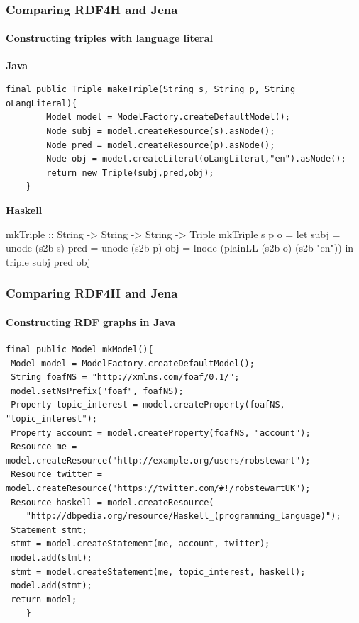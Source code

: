 \documentclass{beamer}
\begin{document}
\begin{frame}[fragile]
\frametitle{Comparing RDF4H and Jena}
\framesubtitle{Constructing triples with language literal}

\textbf{Java}

\begin{lstlisting}[style=MyJavaStyle]
final public Triple makeTriple(String s, String p, String oLangLiteral){
        Model model = ModelFactory.createDefaultModel();
        Node subj = model.createResource(s).asNode();
        Node pred = model.createResource(p).asNode();
        Node obj = model.createLiteral(oLangLiteral,"en").asNode();
        return new Triple(subj,pred,obj);
    }
\end{lstlisting}

\bigskip
\textbf{Haskell}

\begin{haskellcode}
mkTriple :: String -> String -> String -> Triple
mkTriple s p o = 
  let subj = unode (s2b s)
      pred = unode (s2b p)
      obj =  lnode (plainLL (s2b o) (s2b "en"))
  in triple subj pred obj
\end{haskellcode}

\end{frame}

\begin{frame}[fragile]
\frametitle{Comparing RDF4H and Jena}
\framesubtitle{Constructing RDF graphs in Java}


\begin{lstlisting}[style=MyJavaStyle,basicstyle=\scriptsize]
final public Model mkModel(){
 Model model = ModelFactory.createDefaultModel();
 String foafNS = "http://xmlns.com/foaf/0.1/";
 model.setNsPrefix("foaf", foafNS);
 Property topic_interest = model.createProperty(foafNS, "topic_interest");
 Property account = model.createProperty(foafNS, "account");
 Resource me = model.createResource("http://example.org/users/robstewart");
 Resource twitter = model.createResource("https://twitter.com/#!/robstewartUK");
 Resource haskell = model.createResource(
    "http://dbpedia.org/resource/Haskell_(programming_language)");
 Statement stmt;
 stmt = model.createStatement(me, account, twitter);
 model.add(stmt);
 stmt = model.createStatement(me, topic_interest, haskell);
 model.add(stmt);
 return model;
    }
\end{lstlisting}

\end{frame}
\end{document}
